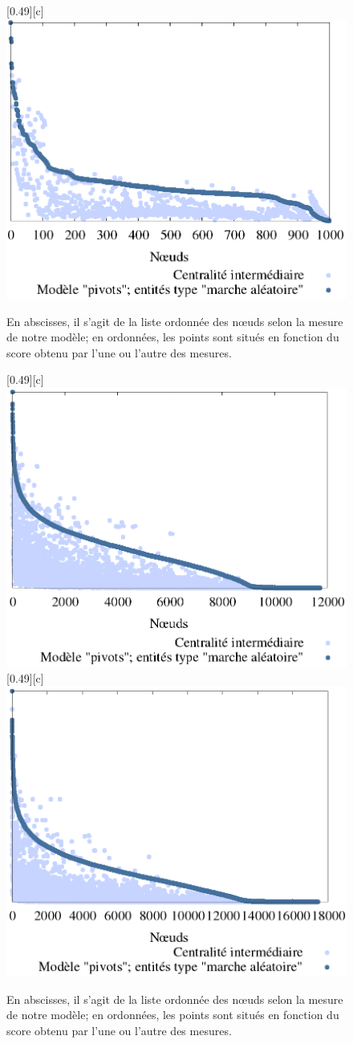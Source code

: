 \documentclass{beamer}
\begin{document}
\begin{frame}
    \begin{figure}[htbp]
		\centering
		[0.49\linewidth][c]{
			\includegraphics[width=0.49\linewidth]{./img/pivots_marche_aleatoire_small_world_1000_4_0_01.png}
		}
		\caption{En abscisses, il s'agit de la liste ordonnée des n\oe uds selon la mesure de notre modèle; en ordonnées, les points sont situés en fonction du score obtenu par l'une ou l'autre des mesures.}
		\label{fig:graphiques_pivots_random_walk_2}
	\end{figure}
\end{frame}


\begin{frame}
    \begin{figure}[htbp]
		\centering
		[0.49\linewidth][c]{
			\includegraphics[width=0.49\linewidth]{./img/pivots_marche_aleatoire_le_havre.png}
		}
		\hfill
		[0.49\linewidth][c]{
			\includegraphics[width=0.49\linewidth]{./img/pivots_marche_aleatoire_rouen.png}
		}
		\caption{En abscisses, il s'agit de la liste ordonnée des n\oe uds selon la mesure de notre modèle; en ordonnées, les points sont situés en fonction du score obtenu par l'une ou l'autre des mesures.}
		\label{fig:graphiques_pivots_random_walk_2}
	\end{figure}
\end{frame}
\end{document}
